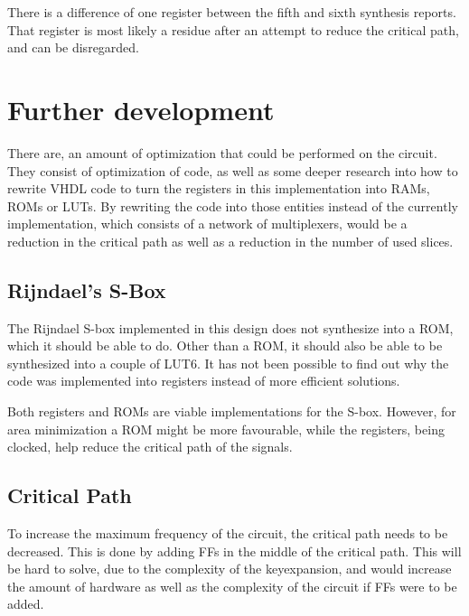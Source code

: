 
There is a difference of one register between the fifth and sixth 
synthesis reports. That register is most likely a residue after an 
attempt to reduce the critical path, and can be disregarded.

\section{Further development}
There are, an amount of optimization that could be performed on the 
circuit. They consist of optimization of code, as well as some deeper 
research into how to rewrite VHDL code to turn the registers in this 
implementation into RAMs, ROMs or LUTs. By rewriting the code into 
those entities instead of the currently implementation, which consists 
of a network of multiplexers, would be a reduction in the critical path
as well as a reduction in the number of used slices.

\subsection{Rijndael's S-Box}
The Rijndael S-box implemented in this design does not synthesize into 
a ROM, which it should be able to do. Other than a ROM, it should also 
be able to be synthesized into a couple of LUT6. It has not been 
possible to find out why the code was implemented into registers 
instead of more efficient solutions.

Both registers and ROMs are viable implementations for the S-box. 
However, for area minimization a ROM might be more favourable, while 
the registers, being clocked, help reduce the critical path of the 
signals.

\subsection{Critical Path}\label{sec:c_path}
To increase the maximum frequency of the circuit, the critical path 
needs to be decreased. This is done by adding FFs in the middle of the 
critical path. This will be hard to solve, due to the complexity of 
the keyexpansion, and would increase the amount of hardware as well as 
the complexity of the circuit if FFs were to be added.

